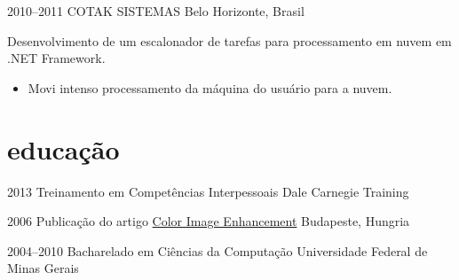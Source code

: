 \documentclass[]{friggeri-cv}
\begin{document}
\begin{entrylist}
\entry
{2010--2011}
{COTAK SISTEMAS}
{Belo Horizonte, Brasil}
{ Desenvolvimento de um escalonador de tarefas para processamento em nuvem em .NET Framework.

  \begin{itemize}
    \item Movi intenso processamento da máquina do usuário para a nuvem.
  \end{itemize}
}

%

\end{entrylist}

\section{educação}
\begin{entrylist}
	\entry
	{2013}
	{{\normalfont Treinamento em} Competências Interpessoais}
	{Dale Carnegie Training}
	
	\entry
	{2006}
	{{\normalfont Publicação do artigo}  \href{http://goo.gl/iwGso6}{Color Image Enhancement}}
	{Budapeste, Hungria}

	\entry
	{2004--2010}
	{{\normalfont Bacharelado em} Ciências da Computação}
	{Universidade Federal de Minas Gerais}
	
\end{entrylist}
\end{document}
